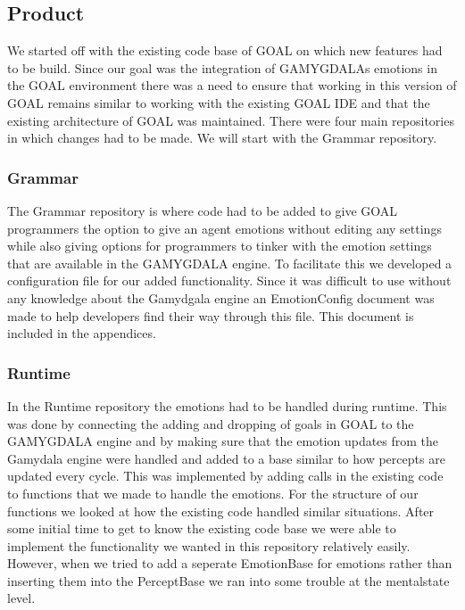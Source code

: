 \documentclass[11pt]{article}
\begin{document}
\subsection{Product}
We started off with the existing code base of GOAL\cite{GOAL} on which new features had to be build. Since our goal was the integration of GAMYGDALAs emotions in the GOAL environment\cite{GOAL Env} there was a need to ensure that working in this version of GOAL remains similar to working with the existing GOAL IDE and that the existing architecture of GOAL was maintained. There were four main repositories in which changes had to be made. We will start with the Grammar repository.
\subsubsection{Grammar}
The Grammar repository is where code had to be added to give GOAL programmers the option to give an agent emotions without editing any settings while also giving options for programmers to tinker with the emotion settings that are available in the GAMYGDALA engine. To facilitate this we developed a configuration file for our added functionality. Since it was difficult to use without any knowledge about the Gamydgala engine an EmotionConfig document was made to help developers find their way through this file. This document is included in the appendices.
\subsubsection{Runtime} 
In the Runtime repository the emotions had to be handled during runtime. This was done by connecting the adding and dropping of goals in GOAL to the GAMYGDALA engine and by making sure that the emotion updates from the Gamydala engine were handled and added to a base similar to how percepts are updated every cycle. This was implemented by adding calls in the existing code to functions that we made to handle the emotions. For the structure of our functions we looked at how the existing code handled similar situations. After some initial time to get to know the existing code base we were able to implement the functionality we wanted in this repository relatively easily. However, when we tried to add a seperate EmotionBase for emotions rather than inserting them into the PerceptBase we ran into some trouble at the mentalstate level. \par 
\end{document}
